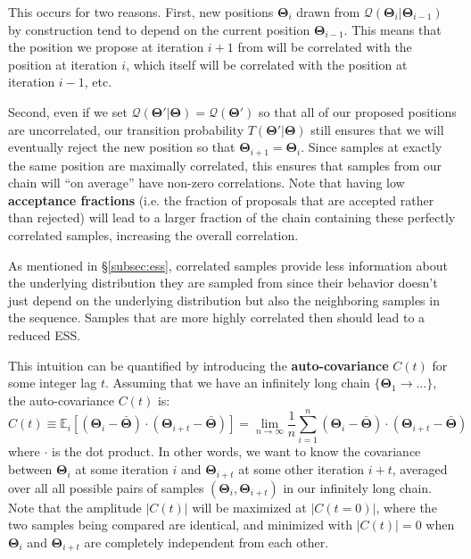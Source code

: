 \documentclass[12pt, titlepage]{article}
\newcommand{\meanwrt}[2]{\ensuremath{\mathbb{E}_{{#2}}\left[{#1}\right]}}
\newcommand{\params}{\ensuremath{\boldsymbol\Theta}}
\newcommand{\proposal}{\ensuremath{\mathcal{Q}}}
\begin{document}
This occurs for two reasons. First, new positions $\params_i$ drawn
from $\proposal(\params_i|\params_{i-1})$ by construction tend to depend
on the current position $\params_{i-1}$. This means that the position
we propose at iteration $i+1$ from will 
be correlated with the position at iteration $i$, 
which itself will be correlated with the position at
iteration $i-1$, etc. 

Second, even if we set
$\proposal(\params'|\params)=\proposal(\params')$ so that all
of our proposed positions are uncorrelated, 
our transition probability $T(\params'|\params)$ still ensures 
that we will eventually reject the new position 
so that $\params_{i+1}=\params_{i}$.
Since samples at exactly the same position are maximally correlated,
this ensures that samples from our chain will ``on average'' have non-zero
correlations. Note that having low \textbf{acceptance fractions} 
(i.e. the fraction of proposals that are accepted rather than rejected)
will lead to a larger fraction of the chain containing 
these perfectly correlated samples, increasing the overall correlation.

As mentioned in \S\ref{subsec:ess}, correlated samples
provide less information about the underlying distribution they
are sampled from since their behavior doesn't just depend on the
underlying distribution but also the neighboring samples in the
sequence. Samples that are more highly correlated then should 
lead to a reduced ESS.

This intuition can be quantified by introducing
the \textbf{auto-covariance} $C(t)$ 
for some integer lag $t$. Assuming that we have an infinitely long chain
$\{ \params_{1} \rightarrow \dots \}$,
the auto-covariance $C(t)$ is:
\begin{equation}
    C(t) \equiv \meanwrt{(\params_{i} - \bar{\params})
    \cdot (\params_{i+t} - \bar{\params})}{i}
    = \lim_{n\rightarrow\infty} \frac{1}{n}
    \sum_{i=1}^{n} (\params_{i} - \bar{\params}) \cdot (\params_{i+t} - \bar{\params})
\end{equation}
where $\cdot$ is the dot product. In other words, 
we want to know the covariance between $\params_i$ at some iteration
$i$ and $\params_{i+t}$ at some other iteration $i+t$, averaged
over all all possible pairs of samples $(\params_i, \params_{i+t})$
in our infinitely long chain. Note that the amplitude $|C(t)|$
will be maximized at $|C(t=0)|$,
where the two samples being compared are identical,
and minimized with $|C(t)|=0$ when 
$\params_{i}$ and $\params_{i+t}$ are completely independent
from each other.
\end{document}
